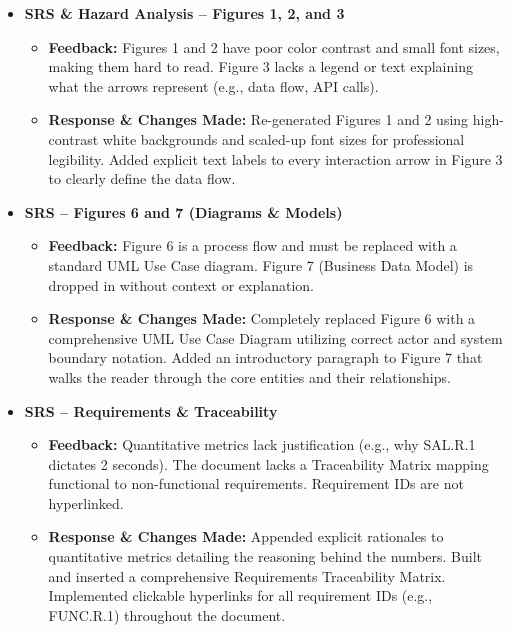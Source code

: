 \documentclass{article}
\begin{document}
\begin{itemize}
    \item \textbf{SRS \& Hazard Analysis -- Figures 1, 2, and 3}
    \begin{itemize}
        \item \textbf{Feedback:} Figures 1 and 2 have poor color contrast and small font sizes, making them hard to read. Figure 3 lacks a legend or text explaining what the arrows represent (e.g., data flow, API calls).
        \item \textbf{Response \& Changes Made:} Re-generated Figures 1 and 2 using high-contrast white backgrounds and scaled-up font sizes for professional legibility. Added explicit text labels to every interaction arrow in Figure 3 to clearly define the data flow.
    \end{itemize}

    \item \textbf{SRS -- Figures 6 and 7 (Diagrams \& Models)}
    \begin{itemize}
        \item \textbf{Feedback:} Figure 6 is a process flow and must be replaced with a standard UML Use Case diagram. Figure 7 (Business Data Model) is dropped in without context or explanation.
        \item \textbf{Response \& Changes Made:} Completely replaced Figure 6 with a comprehensive UML Use Case Diagram utilizing correct actor and system boundary notation. Added an introductory paragraph to Figure 7 that walks the reader through the core entities and their relationships.
    \end{itemize}

    \item \textbf{SRS -- Requirements \& Traceability}
    \begin{itemize}
        \item \textbf{Feedback:} Quantitative metrics lack justification (e.g., why SAL.R.1 dictates 2 seconds). The document lacks a Traceability Matrix mapping functional to non-functional requirements. Requirement IDs are not hyperlinked.
        \item \textbf{Response \& Changes Made:} Appended explicit rationales to quantitative metrics detailing the reasoning behind the numbers. Built and inserted a comprehensive Requirements Traceability Matrix. Implemented clickable hyperlinks for all requirement IDs (e.g., FUNC.R.1) throughout the document.
    \end{itemize}


\end{itemize}
\end{document}
